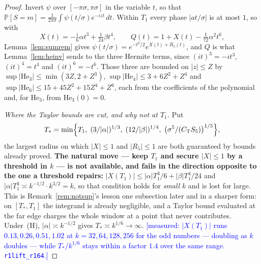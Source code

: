 \documentclass[11pt,a4paper]{article}
\theoremstyle{plain}
\theoremstyle{definition}
\theoremstyle{remark}
\newcommand{\STATUS}[1]{\textcolor{blue}{\textsf{[#1]}}}
\begin{document}
\begin{proof}
Invert $\psi$ over $[-\pi\sigma,\pi\sigma]$ in the variable $t$, so that
$\mathbb{P}[S=m]=\frac1{2\pi\sigma}\int\psi(t/\sigma)e^{-izt}\,dt$. Within $T_1$ every phase
$|at/\sigma|$ is at most $1$, so with
\[
  X(t)=-\tfrac{i}{6}\alpha t^{3}+\tfrac1{24}\beta t^{4},\qquad
  Q(t)=1+X(t)-\tfrac1{72}\alpha^{2}t^{6},
\]
Lemma~\ref{lem:sumrem} gives $\psi(t/\sigma)=e^{-t^{2}/2}e^{X(t)+R_5(t)}$, and $Q$ is what
Lemma~\ref{lem:heinv} sends to the three Hermite terms, since $(it)^{3}=-it^{3}$,
$(it)^{4}=t^{4}$ and $(it)^{6}=-t^{6}$. Those three are bounded on $|z|\le Z$ by
$\sup|\mathrm{He}_3|\le\min(3Z,2+Z^{3})$, $\sup|\mathrm{He}_4|\le3+6Z^{2}+Z^{4}$ and
$\sup|\mathrm{He}_6|\le15+45Z^{2}+15Z^{4}+Z^{6}$, each from the coefficients of the polynomial
and, for $\mathrm{He}_3$, from $\mathrm{He}_3(0)=0$.

\medskip\noindent
\emph{Where the Taylor bounds are cut, and why not at $T_1$.} Put
\[
  T_{*}=\min\Bigl\{T_1,\;(3/|\alpha|)^{1/3},\;(12/|\beta|)^{1/4},\;
        \bigl(\sigma^{5}/(C_{\mathrm{T}}S_5)\bigr)^{1/5}\Bigr\},
\]
the largest radius on which $|X|\le1$ and $|R_5|\le1$ are both guaranteed by bounds already
proved. \textbf{The natural move --- keep $T_1$ and secure $|X|\le1$ by a threshold in $k$ ---
is not available, and fails in the direction opposite to the one a threshold repairs:}
$|X(T_1)|\le|\alpha|T_1^{3}/6+|\beta|T_1^{4}/24$ and $|\alpha|T_1^{3}\asymp
k^{-1/2}\cdot k^{3/2}=k$, so that condition holds for \emph{small} $k$ and is lost for large.
This is Remark~\ref{rem:notsup}'s lesson one subsection later and in a sharper form: on
$[T_{*},T_1]$ the integrand is already negligible, and a Taylor bound evaluated at the far edge
charges the whole window at a point that never contributes. Under~\textup{(H)},
$|\alpha|\asymp k^{-1/2}$ gives $T_{*}\asymp k^{1/6}\to\infty$.
\STATUS{measured: $|X(T_1)|$ runs $0.13,0.26,0.51,1.02$ at $k=32,64,128,256$ for the odd
numbers --- doubling as $k$ doubles --- while $T_{*}/k^{1/6}$ stays within a factor $1.4$ over
the same range. \texttt{r1lift\_r164}.}


\end{proof}
\end{document}
